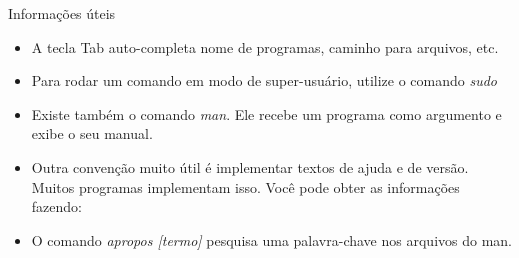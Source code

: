 \documentclass{beamer}
\begin{document}
\begin{frame}{Informações úteis}
  \begin{itemize}
    \item A tecla Tab auto-completa nome de programas, caminho para arquivos,
      etc.
  \item Para rodar um comando em modo de super-usuário, utilize o comando
    \emph{sudo}
  \item Existe também o comando \emph{man}. Ele recebe um programa como
    argumento e exibe o seu manual.
  \item Outra convenção muito útil é implementar textos de ajuda e de versão.
    Muitos programas implementam isso. Você pode obter as informações fazendo:
  \item O comando \emph{apropos [termo]} pesquisa uma palavra-chave nos arquivos
    do man.
  \end{itemize}
  \begin{center}
    \begin{shell}
    \end{shell}
  \end{center}
\end{frame}

\begin{frame}
  \begin{center}
    \begin{shell}
    \end{shell}
  \end{center}
\end{frame}
\end{document}
